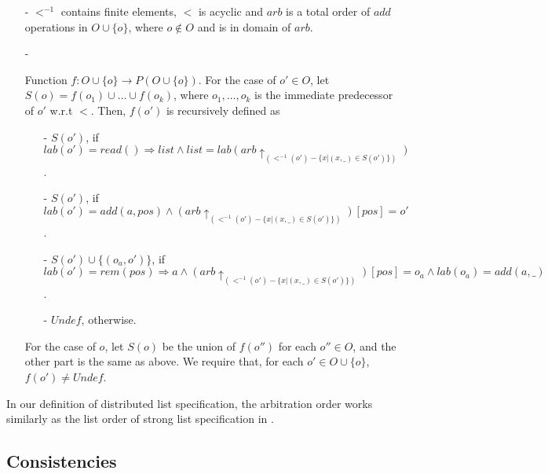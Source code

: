 \begin{itemize}
\setlength{\itemsep}{0.5pt}
\item[-] $<^{-1}$ contains finite elements, $<$ is acyclic and $arb$ is a total order of $add$ operations in $O \cup \{ o \}$, where $o \notin O$ and is in domain of $arb$.

\item[-] {\color {red}Function $f: O \cup \{ o \} \rightarrow P(O \cup \{ o \})$. For the case of $o' \in O$, let $S(o) = f(o_1) \cup \ldots \cup f(o_k)$, where $o_1,\ldots,o_k$ is the immediate predecessor of $o'$ w.r.t $<$. Then, $f(o')$ is recursively defined as

    \begin{itemize}
    \setlength{\itemsep}{0.5pt}
    \item[-] $S(o')$, if $lab(o')=read()\Rightarrow list \wedge list = lab( arb \uparrow_{ (<^{-1}(o')-\{ x \vert (x,\_) \in S(o')\}) } )$.

    \item[-] $S(o')$, if $lab(o')=add(a,pos) \wedge ( arb \uparrow_{ (<^{-1}(o')-\{ x \vert (x,\_) \in S(o')\}) } )[pos]=o'$.

    \item[-] $S(o') \cup \{ (o_a,o') \}$, if $lab(o')=rem(pos)\Rightarrow a \wedge ( arb \uparrow_{ (<^{-1}(o')-\{ x \vert (x,\_) \in S(o')\}) } )[pos]=o_a \wedge lab(o_a)=add(a,\_)$.

    \item[-] $\mathit{Undef}$, otherwise.
    \end{itemize} 
    
    For the case of $o$, let $S(o)$ be the union of $f(o'')$ for each $o'' \in O$, and the other part is the same as above. We require that, for each $o' \in O \cup \{ o \}$, $f(o') \neq \mathit{Undef}$.}
\end{itemize}


In our definition of distributed list specification, the arbitration order works similarly as the list order of strong list specification in \cite{Attiya:2016}.





\subsection{Consistencies}
\label{subsec:consistencies}

